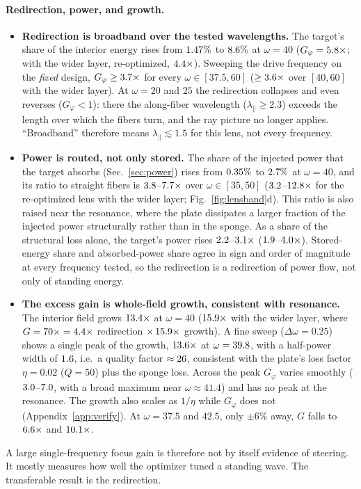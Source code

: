 \paragraph{Redirection, power, and growth.}
\begin{itemize}[itemsep=1pt]
\item \textbf{Redirection is broadband over the tested wavelengths.} The target's share of the interior
  energy rises from $1.47\%$ to $8.6\%$ at $\omega=40$ ($G_\varphi=5.8\times$; with the wider
  layer, re-optimized, $4.4\times$). Sweeping the drive frequency on the \emph{fixed} design,
  $G_\varphi\ge3.7\times$ for every $\omega\in[37.5,60]$ ($\ge3.6\times$ over
  $[40,60]$ with the wider layer). At $\omega=20$ and $25$ the redirection collapses and even reverses
  ($G_\varphi<1$): there the along-fiber wavelength ($\lambda_\parallel\ge2.3$) exceeds the length over which
  the fibers turn, and the ray picture no longer applies. ``Broadband'' therefore means
  $\lambda_\parallel\lesssim1.5$ for this lens, not every frequency.
\item \textbf{Power is routed, not only stored.} The share of the injected power that the target absorbs
  (Sec.~\ref{sec:power}) rises from $0.35\%$ to $2.7\%$ at $\omega=40$, and its
  ratio to straight fibers is $3.8$--$7.7\times$ over $\omega\in[35,50]$
  ($3.2$--$12.8\times$ for the re-optimized lens with the wider layer;
  Fig.~\ref{fig:lensband}d). This ratio is also raised near the resonance, where the plate dissipates a larger
  fraction of the injected power structurally rather than in the sponge. As a share of the structural loss
  alone, the target's power rises $2.2$--$3.1\times$ ($1.9$--$4.0\times$).
  Stored-energy share and absorbed-power share agree in sign and order of magnitude at every frequency
  tested, so the redirection is a redirection of power flow, not only of standing energy.
\item \textbf{The excess gain is whole-field growth, consistent with resonance.} The interior field grows
  $13.4\times$ at $\omega=40$ ($15.9\times$ with the wider layer, where $G=70\times=4.4\times$
  redirection $\times\,15.9\times$ growth). A fine sweep ($\Delta\omega=0.25$) shows a single peak of the
  growth, $13.6\times$ at $\omega=39.8$, with a half-power width of $1.6$, i.e.\ a
  quality factor $\approx26$, consistent with the plate's loss factor $\eta=0.02$ ($Q=50$) plus the
  sponge loss. Across the peak $G_\varphi$ varies smoothly ($3.0$--$7.0$, with a broad maximum near
  $\omega\approx41.4$) and has no peak at the resonance.
  The growth also scales as $1/\eta$ while $G_\varphi$ does not (Appendix~\ref{app:verify}). At $\omega=37.5$
  and $42.5$, only $\pm6\%$ away, $G$ falls to $6.6\times$ and $10.1\times$.
\end{itemize}
A large single-frequency focus gain is therefore not by itself evidence of steering. It mostly
measures how well the optimizer tuned a standing wave. The transferable result is the redirection.

